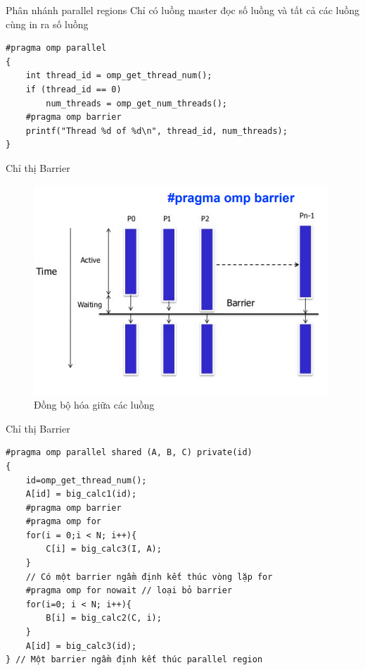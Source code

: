 \documentclass[10pt]{beamer}
\theoremstyle{remark}
\numberwithin{algocf}{section}
\numberwithin{equation}{section}
\numberwithin{dl}{section}
\numberwithin{figure}{section}
\begin{document}
\begin{frame}[fragile]{Phân nhánh parallel regions}
    Chỉ có luồng master đọc số luồng và tất cả các luồng cùng in ra số luồng
    \begin{verbatim}
#pragma omp parallel
{
    int thread_id = omp_get_thread_num();
    if (thread_id == 0)
        num_threads = omp_get_num_threads();
    #pragma omp barrier
    printf("Thread %d of %d\n", thread_id, num_threads); 
}
    \end{verbatim}
\end{frame}

\begin{frame}{Chỉ thị Barrier}
    \begin{figure}[H]
        \centering
        \includegraphics[width=0.9\linewidth]{figures/OpenMP/Barrier.png}
        \caption{Đồng bộ hóa giữa các luồng}
    \end{figure}
\end{frame}

\begin{frame}{Chỉ thị Barrier}
    \begin{verbatim}
#pragma omp parallel shared (A, B, C) private(id)
{
    id=omp_get_thread_num();
    A[id] = big_calc1(id);
    #pragma omp barrier
    #pragma omp for
    for(i = 0;i < N; i++){
        C[i] = big_calc3(I, A);
    }
    // Có một barrier ngầm định kết thúc vòng lặp for
    #pragma omp for nowait // loại bỏ barrier
    for(i=0; i < N; i++){ 
        B[i] = big_calc2(C, i); 
    }
    A[id] = big_calc3(id);
} // Một barrier ngầm định kết thúc parallel region
    \end{verbatim}
\end{frame}
\end{document}
